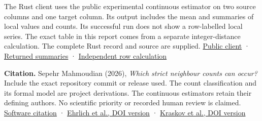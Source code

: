 The Rust client uses the public experimental continuous estimator on two source columns and one target column. Its output includes the mean and summaries of local values and counts. Its successful run does not show a row-labelled local series. The exact table in this report comes from a separate integer-distance calculation. The complete Rust record and source are supplied. \href{https://github.com/sepahead/pid-rs/blob/main/audit/research/strict-neighbour-count-geometry/native/src/main.rs}{Public client} · \href{https://github.com/sepahead/pid-rs/blob/main/audit/research/strict-neighbour-count-geometry/represented-report.json}{Returned summaries} · \href{https://github.com/sepahead/pid-rs/blob/main/audit/research/strict-neighbour-count-geometry/two_arm.py}{Independent row calculation}

\textbf{Citation.} Sepehr Mahmoudian (2026), \emph{Which strict neighbour counts can occur?} Include the exact repository commit or release used. The count classification and its formal model are project derivations. The continuous estimators retain their defining authors. No scientific priority or recorded human review is claimed. \href{https://github.com/sepahead/pid-rs/blob/main/CITATION.cff}{Software citation} · \href{https://doi.org/10.1103/PhysRevE.110.014115}{Ehrlich et al., DOI version} · \href{https://doi.org/10.1103/PhysRevE.69.066138}{Kraskov et al., DOI version}
